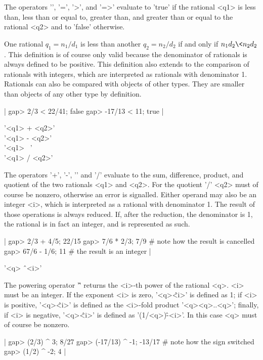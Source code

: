 The operators  '\<',  '\<=', '>',  and  '=>' evaluate  to  'true' if  the
rational  <q1> is  less  than, less than or equal to,  greater than,  and
greater than or equal to the rational <q2> and to 'false' otherwise.

One rational $q_1 = n_1/d_1$ is less than  another $q_2 = n_2/d_2$ if and
only if  $n_1 d_2 \< n_2 d_2$.  This  definition is of  course only valid
because the  denominator of rationals  is always  defined to be positive.
This   definition   also extends   to the comparison   of  rationals with
integers, which are   interpreted   as  rationals with    denominator  1.
Rationals can also  be compared  with objects of  other  types.  They are
smaller than objects of any other type by definition.

|    gap> 2/3 < 22/41;
    false
    gap> -17/13 < 11;
    true |

%

'<q1> + <q2>'   \\
'<q1> - <q2>'   \\
'<q1> \*\ <q2>' \\
'<q1> / <q2>'

The operators '+',  '-',  '\*' and '/' evaluate to the  sum,  difference,
product, and  quotient  of  the  two  rationals  <q1>  and <q2>.  For the
quotient  '/'  <q2>  must of course be  nonzero, otherwise  an  error  is
signalled.   Either  operand  may  also  be  an  integer  <i>,  which  is
interpreted  as a  rational  with  denominator  1.   The result of  those
operations is always reduced.  If, after  the  reduction, the denominator
is 1, the rational is in fact an integer, and is represented as such.

|    gap> 2/3 + 4/5;
    22/15
    gap> 7/6 * 2/3;
    7/9    # note how the result is cancelled
    gap> 67/6 - 1/6;
    11    # the result is an integer |

'<q> \^\ <i>'

The powering operator '\^' returns the <i>-th power  of the rational <q>.
<i> must  be an integer.   If the  exponent <i>  is  zero, '<q>\^<i>'  is
defined as 1; if <i>  is positive, '<q>\^<i>' is  defined as the <i>-fold
product '<q>\*<q>\*..\*<q>'; finally, if  <i> is negative, '<q>\^<i>'  is
defined as '(1/<q>)\^-<i>'.  In this case <q> must of course be nonzero.

|    gap> (2/3) ^ 3;
    8/27
    gap> (-17/13) ^ -1;
    -13/17    # note how the sign switched
    gap> (1/2) ^ -2;
    4 |

